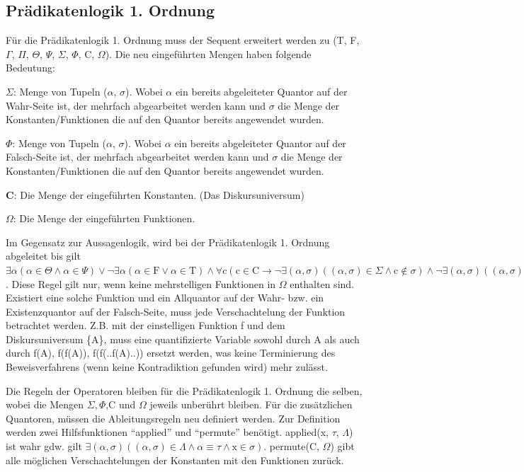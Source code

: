 \subsection{Prädikatenlogik 1. Ordnung}
Für die Prädikatenlogik 1. Ordnung muss der Sequent erweitert werden zu (T, F, $\Gamma$, $\Pi$, $\Theta$, $\Psi$, $\Sigma$, $\Phi$, C, $\Omega$). Die neu eingeführten Mengen haben folgende Bedeutung:
\begin{description}
\item \textbf{$\Sigma$}: Menge von Tupeln ($\alpha$, $\sigma$). Wobei $\alpha$ ein bereits abgeleiteter Quantor auf der Wahr-Seite ist, der mehrfach abgearbeitet werden kann und $\sigma$ die Menge der Konstanten/Funktionen die auf den Quantor bereits angewendet wurden.

\item \textbf{$\Phi$}: Menge von Tupeln ($\alpha$, $\sigma$). Wobei $\alpha$ ein bereits abgeleiteter Quantor auf der Falsch-Seite ist, der mehrfach abgearbeitet werden kann und $\sigma$ die Menge der Konstanten/Funktionen die auf den Quantor bereits angewendet wurden.

\item \textbf{C}: Die Menge der eingeführten Konstanten. (Das Diskursuniversum)

\item \textbf{$\Omega$}: Die Menge der eingeführten Funktionen.
\end{description}

Im Gegensatz zur Aussagenlogik, wird bei der Prädikatenlogik 1. Ordnung abgeleitet bis gilt $\exists\alpha(\alpha\in\Theta\wedge\alpha\in\Psi)\vee\neg\exists\alpha(\alpha\in\textrm{F}\vee\alpha\in\textrm{T})\wedge\forall\textrm{c}(\textrm{c}\in\textrm{C}\rightarrow\neg\exists(\alpha,\sigma)((\alpha,\sigma)\in\Sigma\wedge\textrm{c}\notin\sigma)\wedge\neg\exists(\alpha,\sigma)((\alpha,\sigma)\in\Phi\wedge\textrm{c}\notin\sigma))$. Diese Regel gilt nur, wenn keine mehrstelligen Funktionen in $\Omega$ enthalten sind. Existiert eine solche Funktion und ein Allquantor auf der Wahr- bzw. ein Existenzquantor auf der Falsch-Seite, muss jede Verschachtelung der Funktion betrachtet werden. Z.B. mit der einstelligen Funktion f und dem Diskursuniversum \{A\}, muss eine quantifizierte Variable sowohl durch A als auch durch f(A), f(f(A)), f(f(..f(A)..)) ersetzt werden, was keine Terminierung des Beweisverfahrens (wenn keine Kontradiktion gefunden wird) mehr zulässt.

Die Regeln der Operatoren bleiben für die Prädikatenlogik 1. Ordnung die selben, wobei die Mengen $\Sigma,\Phi$,C und $\Omega$ jeweils unberührt bleiben. Für die zusätzlichen Quantoren, müssen die Ableitungsregeln neu definiert werden. Zur Definition werden zwei Hilfsfunktionen ``applied'' und ``permute'' benötigt. applied(x, $\tau$, $\Lambda$) ist wahr gdw. gilt $\exists(\alpha,\sigma)((\alpha,\sigma)\in\Lambda\wedge\alpha\equiv\tau\wedge\textrm{x}\in\sigma)$. permute(C, $\Omega$) gibt alle möglichen Verschachtelungen der Konstanten mit den Funktionen zurück.

